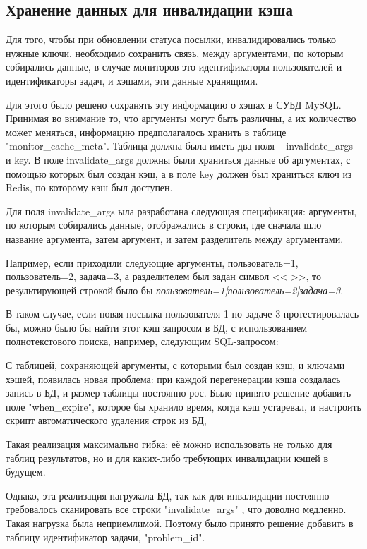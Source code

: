 \subsection{Хранение данных для инвалидации кэша}

Для того, чтобы при обновлении статуса посылки, 
инвалидировались только нужные ключи, 
необходимо сохранить связь, между аргументами, по которым собирались данные,
в случае мониторов это идентификаторы пользователей и идентификаторы задач, 
и хэшами, эти данные хранящими.

Для этого было решено сохранять эту информацию о хэшах в СУБД MySQL.
Принимая во внимание то, что аргументы могут быть различны,
а их количество может меняться,
информацию предполагалось хранить в таблице "monitor\_cache\_meta".
Таблица должна была иметь два поля -- invalidate\_args и key.
В поле invalidate\_args должны были храниться данные об аргументах, 
с помощью которых был создан кэш, 
а в поле key должен был храниться ключ из Redis, 
по которому кэш был доступен. 

Для поля invalidate\_args ыла разработана следующая спецификация: 
аргументы, по которым собирались данные, отображались в строки, 
где сначала шло название аргумента, затем аргумент, 
и затем разделитель между аргументами.

Например, если приходили следующие аргументы, пользователь=1, пользователь=2, задача=3, а разделителем был задан символ <<|>>, то результирующей строкой было бы \textit{пользователь=1|пользователь=2|задача=3}.

В таком случае, если новая посылка пользователя 1 по задаче 3 протестировалась бы, можно было бы найти этот кэш запросом в БД,
с использованием полнотекстового поиска, например, следующим SQL-запросом:



С таблицей, сохраняющей аргументы, с которыми был создан кэш,
и ключами хэшей, появилась новая проблема:
при каждой перегенерации кэша создалась запись в БД, и размер таблицы постоянно рос.
Было принято решение добавить поле "when\_expire", которое бы хранило время, когда кэш устаревал, и настроить скрипт автоматического удаления строк из БД,

Такая реализация максимально гибка; её можно использовать не только для таблиц результатов,
но и для каких-либо требующих инвалидации кэшей в будущем.

Однако, эта реализация нагружала БД, так как для инвалидации постоянно требовалось сканировать все строки "invalidate\_args"
, что доволно медленно.
Такая нагрузка была неприемлимой.
Поэтому было принято решение добавить в таблицу идентификатор задачи, "problem\_id".

